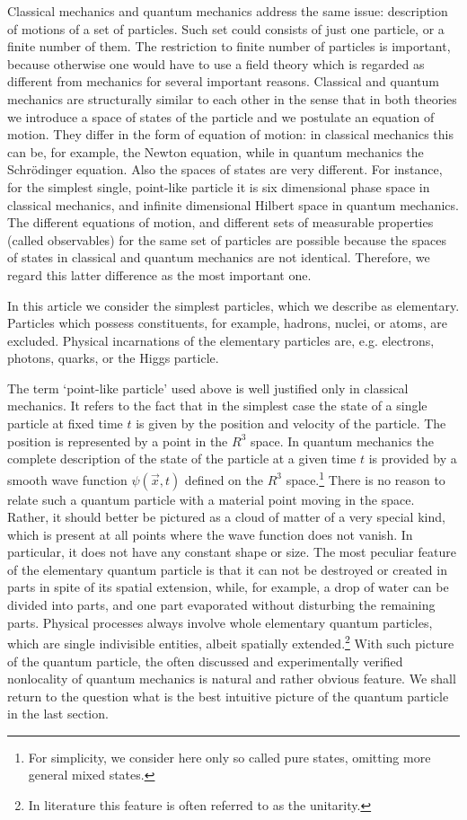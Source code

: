 \documentclass[12pt]{article}
\begin{document}
Classical mechanics and quantum mechanics address the same issue: description of motions of a set of particles. Such set could consists of just one particle, or a finite number of them. The restriction to finite number of particles is important, because otherwise one would have to use a field theory which is regarded as different from mechanics for several important reasons. Classical and quantum mechanics are structurally similar to each other in the sense that in both theories we introduce a space of states of the particle and we postulate an equation of motion. They differ in the form of equation of motion: in classical mechanics this can be, for example, the Newton equation, while in quantum mechanics the Schr\"odinger equation. Also
 the spaces of states are very different. For instance, for the simplest single, point-like particle it is six dimensional phase space in classical mechanics, and infinite dimensional Hilbert space in quantum mechanics. The different equations of motion, and different sets of measurable properties (called observables) for the same set of particles are possible because the spaces of states in classical and quantum mechanics are not identical. Therefore, we regard this latter difference as the most important one. 

In this article we consider the simplest particles, which we describe as elementary. Particles which possess constituents, for example, hadrons, nuclei, or atoms, are excluded. Physical incarnations of the elementary particles are, e.g. electrons, photons, quarks, or the Higgs particle. 

The term `point-like particle' used above is well justified only in classical mechanics. It refers to the fact that in the simplest case the state of a single particle at fixed time $t$ is given by the position and velocity of the particle. The position is represented by a point in the $R^3$ space. In quantum mechanics the complete description of the state of the particle at a given time $t$ is provided by a smooth wave function $\psi(\vec{x}, t)$ defined on the $R^3$ space.\footnote{For simplicity, we consider here only so called pure states, omitting more general mixed states.} 
There is no reason to relate such a quantum particle with a material point moving in the space. Rather, it should better be pictured as a cloud of matter of a very special kind, which is present at all points where the wave function does not vanish. In particular, it does not have any constant shape or size. The most peculiar feature of the elementary quantum particle is that it can not be destroyed or created in parts in spite of its spatial extension, while, for example, a drop of water can be divided into parts, and one part evaporated without disturbing the remaining parts. Physical processes always involve whole elementary quantum particles, which are single indivisible entities, albeit spatially extended.\footnote{In literature this feature is often referred to as the unitarity.} With such picture of the quantum particle, the often discussed and experimentally verified nonlocality of quantum mechanics is natural and rather obvious feature. We shall return to the question what is the best intuitive picture of the quantum particle in the last section. 
\end{document}
